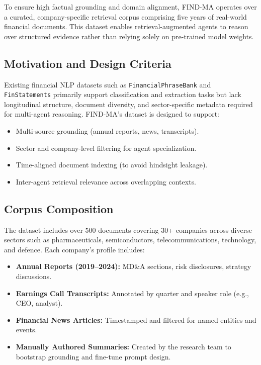 \documentclass[11pt]{article}
\begin{document}
To ensure high factual grounding and domain alignment, FIND-MA operates over a curated, company-specific retrieval corpus comprising five years of real-world financial documents. This dataset enables retrieval-augmented agents to reason over structured evidence rather than relying solely on pre-trained model weights.

\subsection*{Motivation and Design Criteria}

Existing financial NLP datasets such as \texttt{FinancialPhraseBank} and \texttt{FinStatements} primarily support classification and extraction tasks but lack longitudinal structure, document diversity, and sector-specific metadata required for multi-agent reasoning. FIND-MA’s dataset is designed to support:

\begin{itemize}
    \item Multi-source grounding (annual reports, news, transcripts).
    \item Sector and company-level filtering for agent specialization.
    \item Time-aligned document indexing (to avoid hindsight leakage).
    \item Inter-agent retrieval relevance across overlapping contexts.
\end{itemize}

\subsection*{Corpus Composition}

The dataset includes over 500 documents covering 30+ companies across diverse sectors such as pharmaceuticals, semiconductors, telecommunications, technology, and defence. Each company’s profile includes:

\begin{itemize}
    \item \textbf{Annual Reports (2019–2024):} MD\&A sections, risk disclosures, strategy discussions.
    \item \textbf{Earnings Call Transcripts:} Annotated by quarter and speaker role (e.g., CEO, analyst).
    \item \textbf{Financial News Articles:} Timestamped and filtered for named entities and events.
    \item \textbf{Manually Authored Summaries:} Created by the research team to bootstrap grounding and fine-tune prompt design.
\end{itemize}
\end{document}
